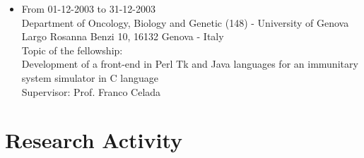 \documentclass[a4paper,10pt]{article}
\begin{document}
\begin{itemize}
\item From 01-12-2003 to 31-12-2003 \\
  Department of Oncology, Biology and Genetic (148) - University of Genova \\
  Largo Rosanna Benzi 10, 16132 Genova - Italy \\
  Topic of the fellowship: \\
  Development of a front-end in Perl Tk and Java languages for an immunitary system simulator in C language \\
  Supervisor: Prof. Franco Celada

\end{itemize}



\section*{Research Activity}



\end{document}
